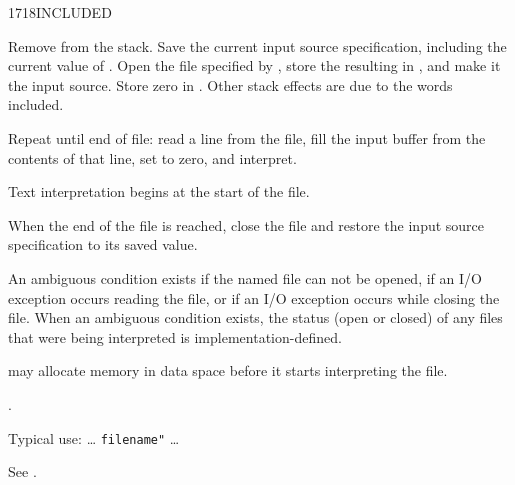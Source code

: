 \begin{worddef}{1718}{INCLUDED}
\item {}

	Remove  from the stack. Save the current input
	source specification, including the current value of
	. Open the file specified by ,
	store the resulting  in , and make
	it the input source. Store zero in . Other
	stack effects are due to the words included.

	Repeat until end of file: read a line from the file, fill the
	input buffer from the contents of that line, set 
	to zero, and interpret.

	Text interpretation begins at the start of the file.

	When the end of the file is reached, close the file and restore
	the input source specification to its saved value.

	An ambiguous condition exists if the named file can not be
	opened, if an I/O exception occurs reading the file, or if an
	I/O exception occurs while closing the file. When an ambiguous
	condition exists, the status (open or closed) of any files that
	were being interpreted is implementation-defined.

	 may allocate memory in data space before it
	starts interpreting the file.

\see {}%
	.

	\begin{rationale} %
		Typical use:
			{\ldots}  \texttt{filename"}  {\ldots}
	\end{rationale}

	\begin{testing} %
		See .
	\end{testing}
\end{worddef}


